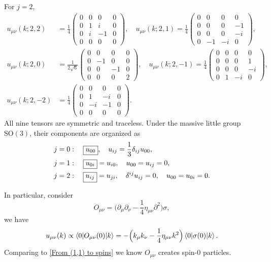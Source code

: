 For $j = 2$,
\begin{align}
    u_{\mu \nu}(k; 2, 2) &= \frac{1}{4} \begin{pmatrix}
        0 & 0 & 0 & 0 \\
        0 & 1 & i & 0 \\
        0 & i & - 1 & 0 \\
        0 & 0 & 0 & 0
    \end{pmatrix}, \quad u_{\mu \nu}(k; 2, 1) = \frac{1}{4} \begin{pmatrix}
        0 & 0 & 0 & 0 \\
        0 & 0 & 0 & - 1 \\
        0 & 0 & 0 & - i \\
        0 & - 1 & - i & 0
    \end{pmatrix}, \\
    u_{\mu \nu}(k; 2, 0) &= \frac{1}{2 \sqrt{6}} \begin{pmatrix}
        0 & 0 & 0 & 0 \\
        0 & - 1 & 0 & 0 \\
        0 & 0 & - 1 & 0 \\
        0 & 0 & 0 & 2
    \end{pmatrix}, \quad u_{\mu \nu}(k; 2, - 1) = \frac{1}{4} \begin{pmatrix}
        0 & 0 & 0 & 0 \\
        0 & 0 & 0 & 1 \\
        0 & 0 & 0 & - i \\
        0 & 1 & - i & 0
    \end{pmatrix}, \\
    u_{\mu \nu}(k; 2, - 2) & = \frac{1}{4} \begin{pmatrix}
        0 & 0 & 0 & 0 \\
        0 & 1 & - i & 0 \\
        0 & - i & - 1 & 0 \\
        0 & 0 & 0 & 0
    \end{pmatrix}.
\end{align}
All nine tensors are symmetric and traceless.
Under the massive little group $\mathrm{SO}(3)$, their components are organized as
\begin{align}
    j = 0 &: \quad \boxed{u_{0 0}}, \quad u_{i j} = \frac{1}{3} \delta_{i j} u_{0 0}, \notag \\
    j = 1 &: \quad \boxed{u_{0 i}} = u_{i 0}, \quad u_{0 0} = u_{i j} = 0, \notag \\
    j = 2 &: \quad \boxed{u_{i j}} = u_{j i}, \quad \delta^{i j} u_{i j} = 0, \quad u_{0 0} = u_{0 i} = 0. \label{From (1,1) to spins}
\end{align}

In particular, consider
\begin{equation}
    O_{\mu \nu} = \Big( \partial_\mu \partial_\nu - \frac{1}{4} \eta_{\mu \nu} \partial^2 \Big) \sigma,
\end{equation}
we have
\begin{equation}
    u_{\mu \nu}(k) \propto \braket{0 | O_{\mu \nu}(0) | k} = - \Big( k_\mu k_\nu - \frac{1}{4} \eta_{\mu \nu} k^2 \Big) \braket{0 | \sigma(0) | k}.
\end{equation}
Comparing to \eqref{From (1,1) to spins} we know $O_{\mu \nu}$ creates spin-0 particles.
